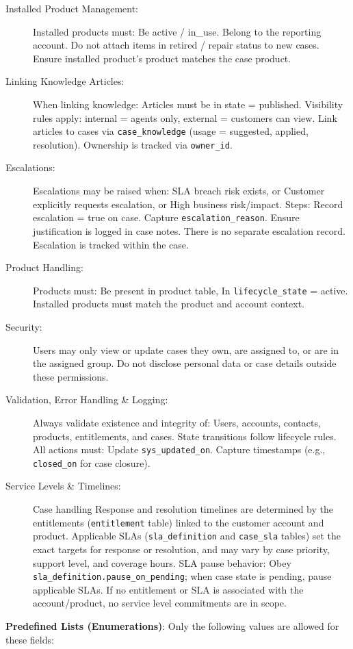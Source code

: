 \begin{taskbox}
\begin{description}
    \item[Installed Product Management:] Installed products must: Be active / in\_use. Belong to the reporting account. Do not attach items in retired / repair status to new cases. Ensure installed product's product matches the case product.
    \item[Linking Knowledge Articles:] When linking knowledge: Articles must be in state = published. Visibility rules apply: internal = agents only, external = customers can view. Link articles to cases via \texttt{case\_knowledge} (usage = suggested, applied, resolution). Ownership is tracked via \texttt{owner\_id}.
    \item[Escalations:] Escalations may be raised when: SLA breach risk exists, or Customer explicitly requests escalation, or High business risk/impact. Steps: Record escalation = true on case. Capture \texttt{escalation\_reason}. Ensure justification is logged in case notes. There is no separate escalation record. Escalation is tracked within the case.
    \item[Product Handling:] Products must: Be present in product table, In \texttt{lifecycle\_state} = active. Installed products must match the product and account context.
    \item[Security:] Users may only view or update cases they own, are assigned to, or are in the assigned group. Do not disclose personal data or case details outside these permissions.
    \item[Validation, Error Handling \& Logging:] Always validate existence and integrity of: Users, accounts, contacts, products, entitlements, and cases. State transitions follow lifecycle rules. All actions must: Update \texttt{sys\_updated\_on}. Capture timestamps (e.g., \texttt{closed\_on} for case closure).
    \item[Service Levels \& Timelines:] Case handling Response and resolution timelines are determined by the entitlements (\texttt{entitlement} table) linked to the customer account and product. Applicable SLAs (\texttt{sla\_definition} and \texttt{case\_sla} tables) set the exact targets for response or resolution, and may vary by case priority, support level, and coverage hours. SLA pause behavior: Obey \texttt{sla\_definition.pause\_on\_pending}; when case state is pending, pause applicable SLAs. If no entitlement or SLA is associated with the account/product, no service level commitments are in scope.
\end{description}

\textbf{Predefined Lists (Enumerations)}: Only the following values are allowed for these fields:


\end{taskbox}
